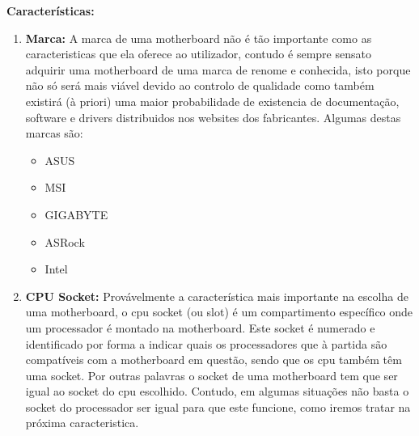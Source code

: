 \large\textbf{Características:}
\begin{enumerate}
	\item \textbf{Marca:} A marca de uma motherboard não é tão importante como as caracteristicas que ela oferece ao utilizador, contudo é sempre sensato adquirir uma motherboard de uma marca de renome e conhecida, isto porque não só será mais viável devido ao controlo de qualidade como também existirá (à priori) uma maior probabilidade de existencia de documentação, software e drivers distribuidos nos websites dos fabricantes. Algumas destas marcas são:

	\begin{itemize}
	\item ASUS
	\item MSI
	\item GIGABYTE
	\item ASRock
	\item Intel
	\end{itemize}
	
	\item \textbf{CPU Socket:} Provávelmente a característica mais importante na escolha de uma motherboard, o \ac{cpu} socket (ou slot) é um compartimento específico onde um processador é montado na motherboard. Este socket é numerado e identificado por forma a indicar quais os processadores que à partida são compatíveis com a motherboard em questão, sendo que os \ac{cpu} também têm uma socket. Por outras palavras o socket de uma motherboard  tem que ser igual ao socket do \ac{cpu} escolhido. Contudo, em algumas situações não basta o socket do processador ser igual para que este funcione, como iremos tratar na próxima caracteristica.
	


\end{enumerate}
